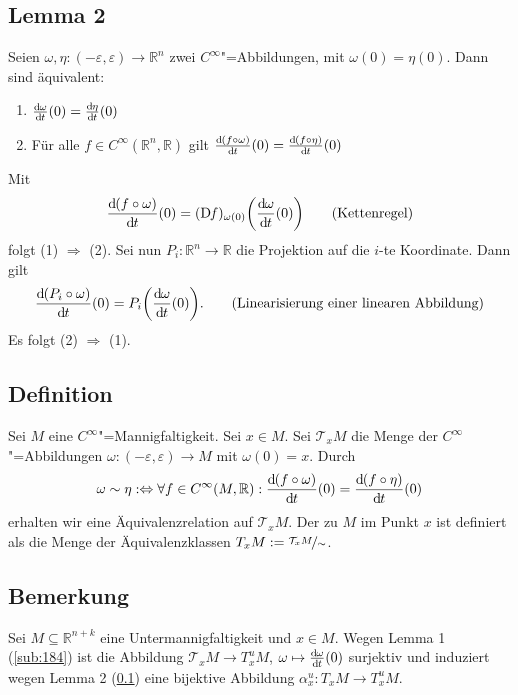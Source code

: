 \subsection[Lemma 2: Äquivalenz, die allgemeine Definition von Tangentialvektoren ermöglicht]{Lemma 2} %
\label{sub:185}
Seien $\omega, \eta : (-\varepsilon, \varepsilon) \to \mathds{R}^n$ zwei $C^\infty$"=Abbildungen, mit $\omega(0)= \eta(0)$. Dann sind äquivalent:
\begin{enumerate}[(1)]
	\item $\frac{\mathrm{d}\mkern-1.0mu \omega}{\mathrm{d}\mkern-1.0mu t} (0)= \frac{\mathrm{d}\mkern-1.0mu \eta}{\mathrm{d}\mkern-1.0mu t} (0)$
	\item Für alle $f \in C^\infty(\mathds{R}^n,\mathds{R})$ gilt $\frac{\mathrm{d}\mkern-1.0mu (f \circ \omega)}{\mathrm{d}\mkern-1.0mu t} (0) = \frac{\mathrm{d}\mkern-1.0mu (f \circ \eta)}{\mathrm{d}\mkern-1.0mu t} (0)$
\end{enumerate}
Mit
\begin{align*}
	\diffd{(f \circ \omega)}{t}(0) = (\D f)_{\omega(0)}\enbrace*{\diffd{\omega}{t}(0)}  \tag*{(Kettenregel)}
\end{align*}
folgt (1) $\Rightarrow $ (2). Sei nun $P_i : \mathds{R}^n \to \mathds{R}$ die Projektion auf die $i$-te Koordinate. Dann gilt
\begin{align*}
	\diffd{(P_i \circ \omega)}{t}(0) = P_i \enbrace*{\diffd{\omega}{t}(0)}. \tag*{(Linearisierung einer linearen Abbildung)}
\end{align*}
Es folgt (2) $\Rightarrow $ (1). \bewende

\subsection[Definition: Tangentialraum]{Definition} %
\label{sub:186}
Sei $M$ eine $C^\infty$"=Mannigfaltigkeit. Sei $x \in M$. Sei $\mathcal{T}_x M$ die Menge der $C^\infty$"=Abbildungen $\omega : (-\varepsilon,\varepsilon) \to M$ mit 
$\omega(0)=x$. Durch
\[
	\omega \sim \eta :\Leftrightarrow \forall f \in C^\infty(M,\mathbb{R}) : \frac{\mathrm{d}\mkern-1.0mu (f \circ \omega)}{\mathrm{d}\mkern-1.0mu t} (0) = \frac{\mathrm{d}\mkern-1.0mu (f \circ \eta)}{\mathrm{d}\mkern-1.0mu t} (0)
\]
erhalten wir eine Äquivalenzrelation auf $\mathcal{T}_xM$. Der  zu $M$ im Punkt $x$ ist definiert als die Menge der Äquivalenzklassen 
$T_x M := \nicefrac{\mathcal{T}_x M}{\sim}$.

\subsection[Bemerkung: Die Definition von $T_x^u M$ ist verträglich mit der allgemeinen Definition]{Bemerkung} %
\label{sub:187}
Sei $M \subseteq \mathds{R}^{n+k}$ eine Untermannigfaltigkeit und $x \in M$. Wegen Lemma 1 (\ref{sub:184}) ist die Abbildung $\mathcal{T}_x M  \to T^u_x M$, 
$\omega \mapsto \frac{\mathrm{d}\mkern-1.0mu \omega}{\mathrm{d}\mkern-1.0mu t} (0)$ surjektiv und induziert wegen Lemma 2 (\ref{sub:185}) eine bijektive Abbildung $\alpha_x^u : T_x M \to T_x^u M$.

